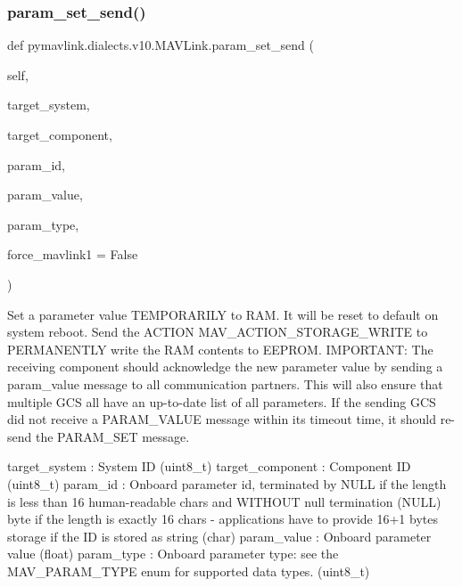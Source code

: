 \begin{DoxyVerb}
\begin{DoxyVerb}
\begin{DoxyVerb}
\begin{DoxyVerb}
\subsubsection{\texorpdfstring{param\+\_\+set\+\_\+send()}{param\_set\_send()}}
{\footnotesize\ttfamily def pymavlink.\+dialects.\+v10.\+M\+A\+V\+Link.\+param\+\_\+set\+\_\+send (\begin{DoxyParamCaption}\item[{}]{self,  }\item[{}]{target\+\_\+system,  }\item[{}]{target\+\_\+component,  }\item[{}]{param\+\_\+id,  }\item[{}]{param\+\_\+value,  }\item[{}]{param\+\_\+type,  }\item[{}]{force\+\_\+mavlink1 = {\ttfamily False} }\end{DoxyParamCaption})}

\begin{DoxyVerb}Set a parameter value TEMPORARILY to RAM. It will be reset to default
on system reboot. Send the ACTION
MAV_ACTION_STORAGE_WRITE to PERMANENTLY write the RAM
contents to EEPROM. IMPORTANT: The receiving component
should acknowledge the new parameter value by sending
a param_value message to all communication partners.
This will also ensure that multiple GCS all have an
up-to-date list of all parameters. If the sending GCS
did not receive a PARAM_VALUE message within its
timeout time, it should re-send the PARAM_SET message.

target_system             : System ID (uint8_t)
target_component          : Component ID (uint8_t)
param_id                  : Onboard parameter id, terminated by NULL if the length is less than 16 human-readable chars and WITHOUT null termination (NULL) byte if the length is exactly 16 chars - applications have to provide 16+1 bytes storage if the ID is stored as string (char)
param_value               : Onboard parameter value (float)
param_type                : Onboard parameter type: see the MAV_PARAM_TYPE enum for supported data types. (uint8_t)\end{DoxyVerb}
 \mbox{\label{classpymavlink_1_1dialects_1_1v10_1_1MAVLink_a445f3537b7801e8d8d109916c9190bfe}} 

\end{DoxyVerb}
\end{DoxyVerb}
\end{DoxyVerb}
\end{DoxyVerb}

